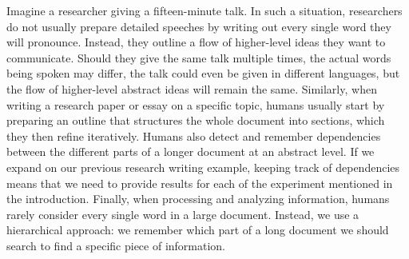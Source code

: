 \documentclass[twoside,11pt]{fairmeta}
\begin{document}
Imagine a researcher giving a fifteen-minute talk. In such a situation, researchers do not usually prepare detailed speeches by writing out every single word they will pronounce. Instead, they outline a flow of higher-level ideas they want to communicate. Should they give the same talk multiple times, the actual words being spoken may differ, the talk could even be given in different languages, but the flow of higher-level abstract ideas will remain the same.
Similarly, when writing a research paper or essay on a specific topic, humans usually start by preparing an outline that structures the whole document into sections, which they then refine iteratively.
Humans also detect and remember dependencies between the different parts of a longer document at an abstract level. If we expand on our previous research writing example, keeping track of dependencies means that we need to provide results for each of the experiment mentioned in the introduction. Finally, when processing and analyzing information, humans rarely consider every single word in a large document. Instead, we use a hierarchical approach: we remember which part of a long document we should search to find a specific piece of information.
\end{document}
